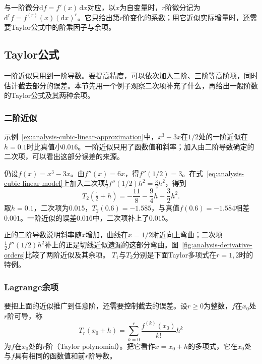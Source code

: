 与一阶微分$\mathrm df=f'(x)\,\mathrm dx$对应，以$x$为自变量时，$r$阶微分记为$\mathrm d^rf=f^{(r)}(x)(\mathrm dx)^r$。它只给出第$r$阶变化的系数；用它近似实际增量时，还需要Taylor公式中的阶乘因子与余项。

\subsection{Taylor公式}
\label{sec:analysis-taylor-approximation}

一阶近似只用到一阶导数。要提高精度，可以依次加入二阶、三阶等高阶项，同时估计截去部分的误差。本节先用一个例子观察二次项补充了什么，再给出一般阶数的Taylor公式及其两种余项。

\subsubsection{二阶近似}
\label{sec:analysis-second-order-curvature}
示例~\ref{ex:analysis-cubic-linear-approximation}中，$x^3-3x$在$1/2$处的一阶近似在$h=0.1$时比真值小$0.016$。一阶近似只用了函数值和斜率；加入由二阶导数确定的二次项，可以看出这部分误差的来源。
\begin{example}[$x^3-3x$在$a=1/2$处的二阶近似]
\label{ex:analysis-cubic-quadratic-approximation}
仍设$f(x)=x^3-3x$。由$f''(x)=6x$，得$f''(1/2)=3$。在式~\eqref{eq:analysis-cubic-linear-model}上加入二次项$\tfrac12f''(1/2)h^2=\tfrac32h^2$，得到
\begin{equation}
 T_2(\tfrac12+h)=-\frac{11}{8}-\frac94h+\frac32h^2.
\label{eq:analysis-cubic-quadratic-model}
\end{equation}
取$h=0.1$，二次项为$0.015$，$T_2(0.6)=-1.585$，与真值$f(0.6)=-1.584$相差$0.001$。一阶近似的误差$0.016$中，二次项补上了$0.015$。
\end{example}
正的二阶导数说明斜率随$x$增加，曲线在$x=1/2$附近向上弯曲；二次项$\tfrac12f''(1/2)h^2$补上的正是切线近似遗漏的这部分弯曲。图~\ref{fig:analysis-derivative-orders}比较了两阶近似及其余项。
$T_1$与$T_2$分别是下面Taylor多项式在$r=1,2$时的特例。

\subsubsection{Lagrange余项}
要把上面的近似推广到任意阶，还需要控制截去的误差。设$r\geq0$为整数，$f$在$x_0$处$r$阶可导，称
\[
 T_r(x_0+h)=\sum_{k=0}^r\frac{f^{(k)}(x_0)}{k!}h^k
\]
为$f$在$x_0$处的$r$阶（Taylor polynomial）。把它看作$x=x_0+h$的多项式，它在$x_0$处与$f$具有相同的函数值和前$r$阶导数。

